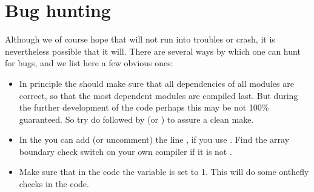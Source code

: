 \documentclass[letterpaper,10pt,english]{sphinxmanual}
\begin{document}
\section{Bug hunting}
\label{\detokenize{tipsandtricks:bug-hunting}}
Although we of course hope that  will not run into
troubles or crash, it is nevertheless possible that it will. There are
several ways by which one can hunt for bugs, and we list here a few
obvious ones:
\begin{itemize}
\item {} 
In principle the  should make sure that all dependencies of all
modules are correct, so that the most dependent modules are compiled last. But
during the further development of the code perhaps this may be not 100\%
guaranteed. So try do  followed by  (or ) to assure a clean make.

\item {} 
In the  you can add (or uncomment) the line
, if you use .  Find the array
boundary check switch on your own compiler if it is not .

\item {} 
Make sure that in the  code the variable  is
set to 1. This will do some on\sphinxhyphen{}the\sphinxhyphen{}fly checks in the code.

\end{itemize}
\end{document}
